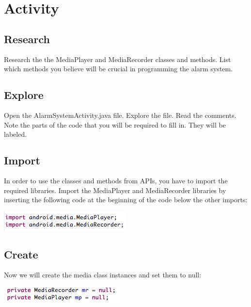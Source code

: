 \section{Activity}

\subsection{Research}
Research the the MediaPlayer and MediaRecorder classes and methods. List which methods you believe will be crucial in programming the alarm system.

\subsection{Explore}
Open the AlarmSystemActivity.java file. Explore the file. Read the comments. Note the parts of the code that you will be required to fill in. They will be labeled.

\subsection{Import}
In order to use the classes and methods from APIs, you have to import the required libraries. Import the MediaPlayer and MediaRecorder libraries by inserting the following code at the beginning of the code below the other imports:
	
\begin{center}

\includegraphics[scale=1]{imports.png} 

\end{center}


\subsection{Create}
Now we will create the media class instances and set them to null:\\

\begin{center}

\includegraphics[scale=1]{instances.png} 

\end{center}

